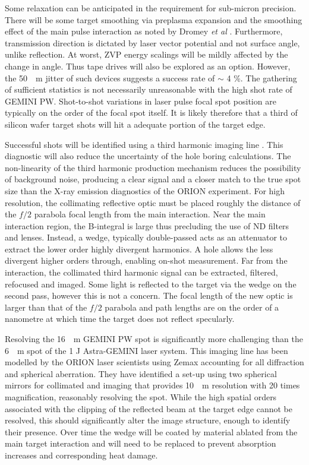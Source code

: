 Some relaxation can be anticipated in the requirement for sub-micron precision. There will be some target smoothing via preplasma expansion and the smoothing effect of the main pulse interaction as noted by Dromey \textit{et al} \cite{dromeyDiffractionlimitedPerformanceFocusing2009}. Furthermore, transmission direction is dictated by laser vector potential and not surface angle, unlike reflection. At worst, ZVP energy scalings will be mildly affected by the change in angle. Thus tape drives will also be explored as an option. However, the \qty{50}{\mu m} jitter of such devices suggests a success rate of $\sim$ 4 \%. The gathering of sufficient statistics is not necessarily unreasonable with the high shot rate of GEMINI PW. Shot-to-shot variations in laser pulse focal spot position are typically on the order of the focal spot itself. It is likely therefore that a third of silicon wafer target shots will hit a adequate portion of the target edge. 

Successful shots will be identified using a third harmonic imaging line \cite{dromeyThirdHarmonicOrder2009}. This diagnostic will also reduce the uncertainty of the hole boring calculations. The non-linearity of the third harmonic production mechanism reduces the possibility of background noise, producing a clear signal and a closer match to the true spot size than the X-ray emission diagnostics of the ORION experiment. For high resolution, the collimating reflective optic must be placed roughly the distance of the $f/2$ parabola focal length from the main interaction. Near the main interaction region, the B-integral is large thus precluding the use of ND filters and lenses. Instead, a wedge, typically double-passed acts as an attenuator to extract the lower order highly divergent harmonics. A hole allows the less divergent higher orders through, enabling on-shot measurement. Far from the interaction, the collimated third harmonic signal can be extracted, filtered, refocused and imaged. Some light is reflected to the target via the wedge on the second pass, however this is not a concern. The focal length of the new optic is larger than that of the $f/2$ parabola and path lengths are on the order of a nanometre at which time the target does not reflect specularly. 

Resolving the \qty{16}{\mu m} GEMINI PW spot is significantly more challenging than the \qty{6}{\mu m} spot of the 1 J Astra-GEMINI laser system. This imaging line has been modelled by the ORION laser scientists using Zemax \cite{AnsysZemaxOpticStudio} accounting for all diffraction and spherical aberration. They have identified a set-up using two spherical mirrors for collimated and imaging that provides \qty{10}{\mu m} resolution with 20 times magnification, reasonably resolving the spot. While the high spatial orders associated with the clipping of the reflected beam at the target edge cannot be resolved, this should significantly alter the image structure, enough to identify their presence. Over time the wedge will be coated by material ablated from the main target interaction and will need to be replaced to prevent absorption increases and corresponding heat damage.

